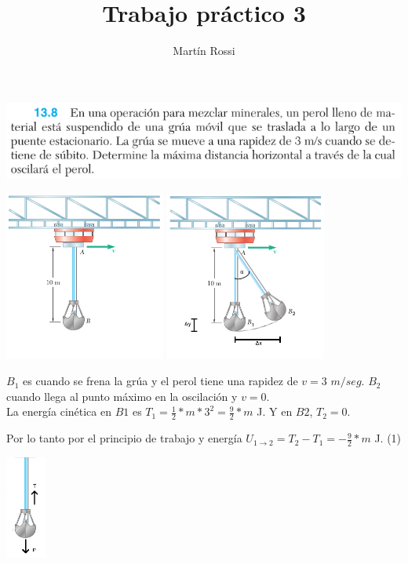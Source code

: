 \documentclass[12pt,fleqn]{article}
\title{\LARGE \textbf{Trabajo práctico 3}}
\author{Martín Rossi}
\date{}
\begin{document}
\maketitle
\includegraphics[width=\linewidth]{13.8}
\begin{center}
\includegraphics[width=200px]{13.8.0}
\includegraphics[width=200px]{13.8.1}
\end{center}

$B_1$ es cuando se frena la grúa y el perol tiene una rapidez de $v=3$ $m/seg$. $B_2$ cuando llega al punto máximo en la oscilación y $v=0$.\\

La energía cinética en $B1$ es $T_1=\frac{1}{2}*m*3^2=\frac{9}{2}*m$ J. Y en $B2$, $T_2=0$.

Por lo tanto por el principio de trabajo y energía $U_{1\rightarrow 2}=T_2-T_1=-\frac{9}{2}*m$ J. (1)

\begin{center}\includegraphics[width=50px]{13.8.2}\end{center}
\end{document}
